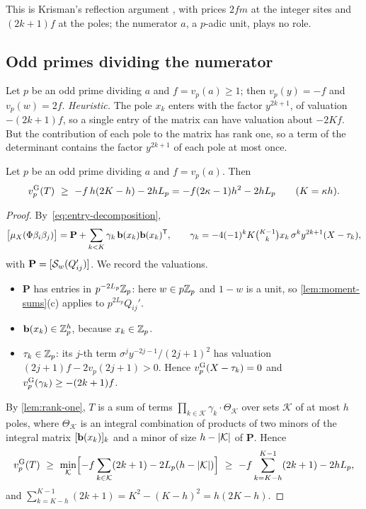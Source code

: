This is Krisman's reflection argument \cite[Lemma~5.2]{Krisman2026chi2}, with prices $2fm$ at
the integer sites and $(2k+1)f$ at the poles; the numerator $a$, a $p$-adic unit, plays no role.

\subsection{Odd primes dividing the numerator}\label{subsec:p-divides-a}

Let $p$ be an odd prime dividing $a$ and $f=v_p(a)\ge1$; then $v_p(y)=-f$ and $v_p(w)=2f$.
\emph{Heuristic.} The pole $x_k$ enters with the factor $y^{2k+1}$, of valuation $-(2k+1)f$,
so a single entry of the matrix can have valuation about $-2Kf$. But the contribution of each
pole to the matrix has rank one, so a term of the determinant contains the factor $y^{2k+1}$ of
each pole at most once.

\begin{proposition}\label{prop:p-divides-a}
Let $p$ be an odd prime dividing $a$ and $f=v_p(a)$. Then
\[
  \vG p(T)\ \ge\ -f\,h(2K-h)-2hL_p=-f(2\kappa-1)h^2-2hL_p\qquad(K=\kappa h).
\]
\end{proposition}

\begin{proof}
By~\eqref{eq:entry-decomposition},
\[
  \bigl[\mu_X(\Phi\beta_i\beta_j)\bigr]=\mathbf P+\sum_{k<K}\gamma_k\,\mathbf{b}(x_k)\mathbf{b}(x_k)^{\mathsf T},
  \qquad\gamma_k=-4(-1)^kK\tbinom{K-1}kx_k\,\sigma^ky^{2k+1}(X-\tau_k),
\]
with $\mathbf P=[\mathcal{S}_w(Q_{ij}')]$. We record the valuations.
\begin{itemize}
\item $\mathbf P$ has entries in $p^{-2L_p}\mathbb{Z}_p$: here $w\in p\mathbb{Z}_p$ and $1-w$ is a unit, so
\cref{lem:moment-sums}(c) applies to $p^{2L_p}Q_{ij}'$.
\item $\mathbf{b}(x_k)\in\mathbb{Z}_p^h$, because $x_k\in\mathbb{Z}_p$.
\item $\tau_k\in\mathbb{Z}_p$: its $j$-th term $\sigma^jy^{-2j-1}/(2j+1)^2$ has valuation
$(2j+1)f-2v_p(2j+1)>0$. Hence $v_{p}^{\mathrm{G}}(X-\tau_k)=0$ and $v_{p}^{\mathrm{G}}(\gamma_k)\ge-(2k+1)f$.
\end{itemize}
By \cref{lem:rank-one}, $T$ is a sum of terms $\prod_{k\in\mathcal K}\gamma_k\cdot\Theta_{\mathcal K}$
over sets $\mathcal K$ of at most $h$ poles, where $\Theta_{\mathcal K}$ is an integral
combination of products of two minors of the integral matrix $[\mathbf{b}(x_k)]_k$ and a minor of
size $h-\left\lvert \mathcal K\right\rvert$ of $\mathbf P$. Hence
\[
  v_{p}^{\mathrm{G}}(T)\ \ge\ \min_{\mathcal K}\Bigl[-f\sum_{k\in\mathcal K}(2k+1)-2L_p(h-\left\lvert \mathcal K\right\rvert)\Bigr]
  \ \ge\ -f\sum_{k=K-h}^{K-1}(2k+1)-2hL_p,
\]
and $\sum_{k=K-h}^{K-1}(2k+1)=K^2-(K-h)^2=h(2K-h)$.
\end{proof}

